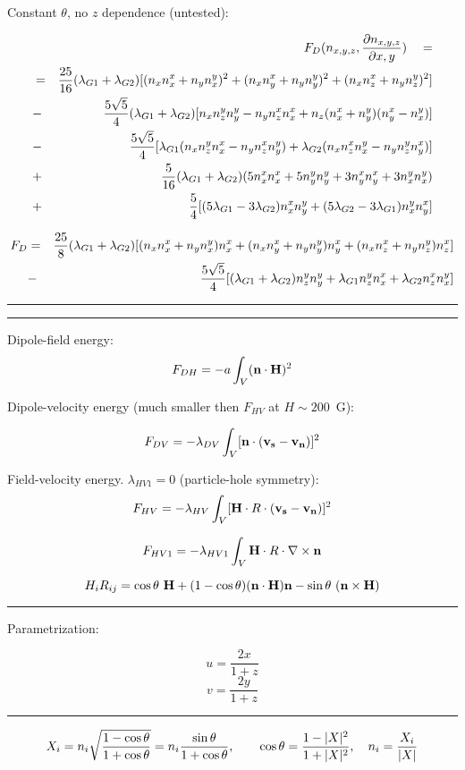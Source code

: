 \documentclass[a4paper]{article}
\begin{document}
Constant $\theta$, no $z$ dependence (untested):

\begin{eqnarray*}
&& F_D(n_{x,y,z}, \frac{\partial n_{x,y,z}}{\partial x,y} ) \quad=\\
&=& \frac{25}{16}(\lambda_{G1}+\lambda_{G2}) [(n_x n_x^x + n_y n_x^y)^2 + (n_x n_y^x + n_y n_y^y)^2 + (n_x n_z^x + n_y n_z^y)^2]\\
&-& \frac{5\sqrt{5}}{4}(\lambda_{G1}+\lambda_{G2})[ n_x n_z^y n_y^y - n_y n_z^x n_x^x + n_z (n_x^x + n_y^y) (n_y^x-n_x^y)]\\
&-& \frac{5\sqrt{5}}{4}[ \lambda_{G1} (n_x n_z^y n_x^x - n_y n_z^x n_y^y) + \lambda_{G2}(n_x n_z^x n_x^y - n_y n_z^y n_y^x)]\\
&+& \frac{5}{16}(\lambda_{G1}+\lambda_{G2}) (5n_x^x n_x^x + 5n_y^y n_y^y + 3n_y^x n_y^x + 3n_x^y n_x^y)\\
&+& \frac{5}{4}[(5\lambda_{G1}-3\lambda_{G2}) n_x^x n_y^y + (5\lambda_{G2}-3\lambda_{G1}) n_x^y n_y^x]
\end{eqnarray*}

\begin{eqnarray*}
F_D
&=& \frac{25}{8}(\lambda_{G1}+\lambda_{G2}) [(n_x n_x^x + n_y n_x^y) n_x^x + (n_x n_y^x + n_y n_y^y)n_y^x + (n_x n_z^x + n_y n_z^y)n_z^x]\\
&-& \frac{5\sqrt{5}}{4}[ (\lambda_{G1}+\lambda_{G2}) n_z^y n_y^y + \lambda_{G1} n_z^y n_x^x + \lambda_{G2} n_z^x n_x^y ]\\
\end{eqnarray*}




\medskip\hrule\medskip
\eject
\medskip\hrule\medskip

Dipole-field energy:
$$
F_{DH} = - a \int_V ({\bf n}\cdot{\bf H})^2
$$


Dipole-velocity energy (much smaller then $F_{HV}$ at $H \sim 200$~G):

$$
F_{DV} = - \lambda_{DV} \int_V [{\bf n}\cdot{(\bf v_s - v_n)}]^2
$$

Field-velocity energy. $\lambda_{HV1}=0$ (particle-hole symmetry):
$$
F_{HV} = - \lambda_{HV} \int_V [{\bf H}\cdot R \cdot {(\bf v_s - v_n)}]^2
$$

$$
F_{HV1} = - \lambda_{HV1} \int_V {\bf H}\cdot R \cdot \nabla\times{\bf n}
$$

$$
H_i R_{ij} = \cos\theta\ {\bf H} + (1-\cos\theta) ({\bf n}\cdot{\bf H}) {\bf n} - \sin\theta\ ({\bf n}\times{\bf H})
$$
\medskip\hrule\medskip

Parametrization:

$$
u = \frac{2x}{1+z}
$$
$$
v = \frac{2y}{1+z}
$$

\medskip\hrule\medskip

$$
X_i = n_i \sqrt{\frac{1-\cos\theta}{1+\cos\theta}} = n_i \frac{\sin\theta}{1+\cos\theta}, \qquad
\cos\theta = \frac{1-|X|^2}{1+|X|^2},\quad
n_i = \frac{X_i}{|X|}
$$
\end{document}
